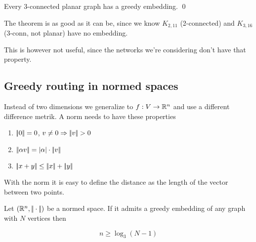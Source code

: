 \begin{thm} Every 3-connected planar graph has a greedy embedding. \qed\end{thm}

The theorem is as good as it can be, since we know $K_{2,11}$ (2-connected) and $K_{3,16}$ (3-conn, not planar) have no embedding.

This is however not useful, since the networks we're considering don't have that property.

\subsection{Greedy routing in normed spaces}

Instead of two dimensions we generalize to $f:V\rightarrow \mathbb{R}^n$ and use a different difference metrik. A norm needs to have these properties

\begin{enumerate}
\item $|\!|0|\!| = 0$, $v\neq 0 \Rightarrow |\!|v|\!| >0$
\item $|\!|\alpha v|\!|= |\alpha | \cdot |\!|v|\!|$
\item $|\!|x+y|\!| \leq |\!|x|\!| +|\!|y|\!|$
\end{enumerate}

With the norm it is easy to define the distance as the length of the vector between two points.

\begin{lem} Let $(\mathbb{R}^n, |\!|\cdot|\!|)$ be a normed space. If it admits a greedy embedding of any graph with $N$ vertices then

\[n \geq \log_3(N-1)\]
\end{lem}

